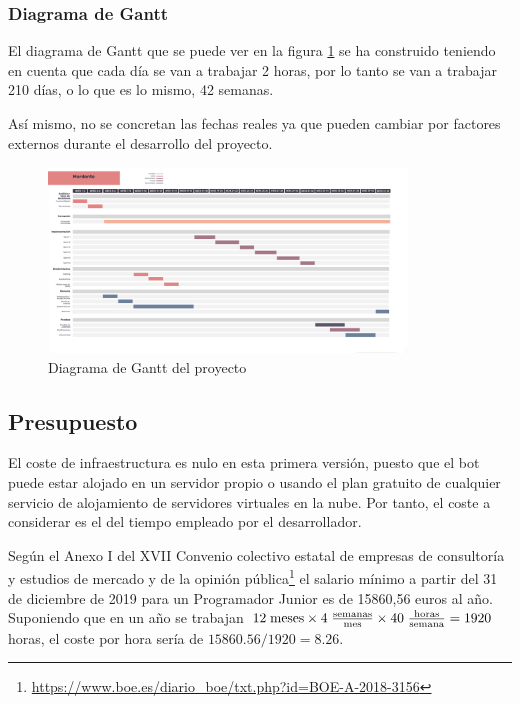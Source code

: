 \subsubsection{Diagrama de Gantt}

El diagrama de Gantt que se puede ver en la figura \ref{fig:gantt} se ha construido teniendo en cuenta que cada día se van a trabajar 2 horas, por lo tanto se van a trabajar 210 días, o lo que es lo mismo, 42 semanas.

Así mismo, no se concretan las fechas reales ya que pueden cambiar por factores externos durante el desarrollo del proyecto.

\begin{figure}[h]
\centering
\includegraphics[angle=90,origin=c,width=0.85\textwidth]{imagenes/gantt.png}
\caption{Diagrama de Gantt del proyecto}
\label{fig:gantt}
\end{figure}


\subsection{Presupuesto}

El coste de infraestructura es nulo en esta primera versión, puesto que el bot puede estar alojado en un servidor propio o usando el plan gratuito de cualquier servicio de alojamiento de servidores virtuales en la nube. Por tanto, el coste a considerar es el del tiempo empleado por el desarrollador.

Según el Anexo I del XVII Convenio colectivo estatal de empresas de consultoría y estudios de mercado y de la opinión pública\footnote{\url{https://www.boe.es/diario_boe/txt.php?id=BOE-A-2018-3156}} el salario mínimo a partir del 31 de diciembre de 2019 para un Programador Junior es de 15860,56 euros al año. Suponiendo que en un año se trabajan $12\;\textnormal{meses} \times 4\;\frac{\textnormal{semanas}}{\textnormal{mes}} \times 40\;\frac{\textnormal{horas}}{\textnormal{semana}}  = 1920$ horas, el coste por hora sería de $15860.56 / 1920 = 8.26$\texteuro.

